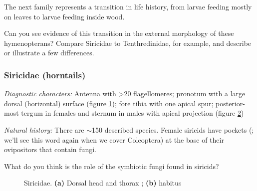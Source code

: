 \noindent{}The next family represents a transition in life history, from larvae feeding mostly on leaves to larvae feeding inside wood.\vspace{3mm}

\begin{theo}
{}Can you see evidence of this transition in the external morphology of these hymenopterans? Compare Siricidae to Tenthredinidae, for example, and describe or illustrate a few differences. %
\end{theo}

\subsubsection{Siricidae (horntails)}
\noindent{}\textit{Diagnostic characters:} Antenna with \textgreater{}20 flagellomeres; pronotum with a large dorsal (horizontal) surface (figure \ref{fig:siricid1}); fore tibia with one apical spur; posterior-most tergum in females and sternum in males with apical projection (figure \ref{fig:siricid2})\vspace{3mm}

\noindent{}\textit{Natural history:} There are $\sim$150 described species. Female siricids have pockets (; we'll see this word again when we cover Coleoptera) at the base of their ovipositors that contain fungi.

\begin{theo}
{}What do you think is the role of the symbiotic fungi found in siricids?
\end{theo}

\begin{figure}[ht!]
    \centering
    \begin{subfigure}[ht!]{0.36\textwidth}
        \caption{}
        \label{fig:siricid1}
    \end{subfigure}
    \hfill
    \begin{subfigure}[ht!]{0.42\textwidth}
        \caption{}
        \label{fig:siricid2}
    \end{subfigure}
    \caption{Siricidae. \textbf{(a)} Dorsal head and thorax \citep[][pg. 70]{goulet1993hymenoptera}; \textbf{(b)} habitus \citep[][Fig. 25]{goulet1993hymenoptera}}\label{fig:siricids}
\end{figure}

